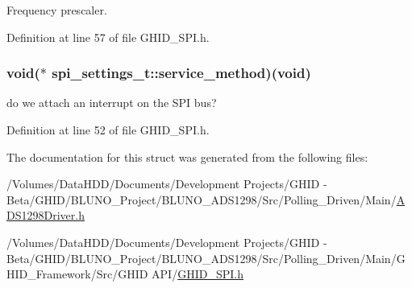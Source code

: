 \-Frequency prescaler. 



\-Definition at line 57 of file \-G\-H\-I\-D\-\_\-\-S\-P\-I.\-h.

\hypertarget{structspi__settings__t_a5c39f66eac994020a016c08dae03e71a}{
\subsubsection[{service\-\_\-method}]{\setlength{\rightskip}{0pt plus 5cm}void($\ast$ {\bf spi\-\_\-settings\-\_\-t\-::service\-\_\-method})(void)}}\label{structspi__settings__t_a5c39f66eac994020a016c08dae03e71a}


do we attach an interrupt on the \-S\-P\-I bus? 



\-Definition at line 52 of file \-G\-H\-I\-D\-\_\-\-S\-P\-I.\-h.



\-The documentation for this struct was generated from the following files\-:\begin{DoxyCompactItemize}
\item 
/\-Volumes/\-Data\-H\-D\-D/\-Documents/\-Development Projects/\-G\-H\-I\-D -\/ Beta/\-G\-H\-I\-D/\-B\-L\-U\-N\-O\-\_\-\-Project/\-B\-L\-U\-N\-O\-\_\-\-A\-D\-S1298/\-Src/\-Polling\-\_\-\-Driven/\-Main/\hyperlink{_a_d_s1298_driver_8h}{\-A\-D\-S1298\-Driver.\-h}\item 
/\-Volumes/\-Data\-H\-D\-D/\-Documents/\-Development Projects/\-G\-H\-I\-D -\/ Beta/\-G\-H\-I\-D/\-B\-L\-U\-N\-O\-\_\-\-Project/\-B\-L\-U\-N\-O\-\_\-\-A\-D\-S1298/\-Src/\-Polling\-\_\-\-Driven/\-Main/\-G\-H\-I\-D\-\_\-\-Framework/\-Src/\-G\-H\-I\-D A\-P\-I/\hyperlink{_g_h_i_d___s_p_i_8h}{\-G\-H\-I\-D\-\_\-\-S\-P\-I.\-h}\end{DoxyCompactItemize}
